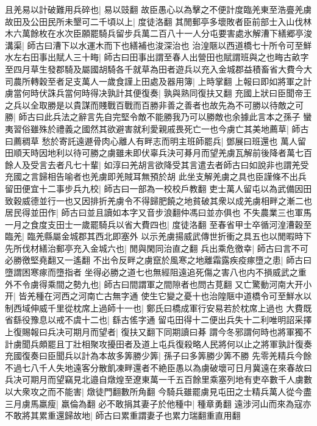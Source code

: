 且羌易以計破難用兵碎也|{
	易以豉翻}
故臣愚心以為擊之不便計度臨羌東至浩亹羌虜故田及公田民所未墾可二千頃以上|{
	度徒洛翻}
其閒郵亭多壞敗者臣前部士入山伐林木六萬餘枚在水次臣願罷騎兵留步兵萬二百八十一人分屯要害處氷解漕下繕郷亭浚溝渠|{
	師古曰漕下以水運木而下也繕補也浚深治也}
治湟陿以西道橋七十所令可至鮮水左右田事出賦人三十畮|{
	師古曰田事出謂至春人出營田也賦謂班與之也畮古畝字}
至四月草生發郡騎及屬國胡騎各千就草為田者遊兵以充入金城郡益積畜省大費今大司農所轉穀至者足支萬人一歲食謹上田處及器用簿|{
	上時掌翻}
上報曰即如將軍之計虜當何時伏誅兵當何時得决孰計其便復奏|{
	孰與熟同復扶又翻}
充國上狀曰臣聞帝王之兵以全取勝是以貴謀而賤戰百戰而百勝非善之善者也故先為不可勝以待敵之可勝|{
	師古曰此兵法之辭言先自完堅令敵不能勝我乃可以勝敵也余據此言本之孫子}
蠻夷習俗雖殊於禮義之國然其欲避害就利愛親戚畏死亡一也今虜亡其美地薦草|{
	師古曰薦稠草}
愁於寄託遠遯骨肉心離人有畔志而明主班師罷兵|{
	鄧展曰班還也}
萬人留田順天時因地利以待可勝之虜雖未即伏辜兵決可朞月而望羌虜瓦解前後降者萬七百餘人及受言去者凡七十輩|{
	如淳曰羌胡言欲降受其言遣去者師古曰如說非也謂羌受充國之言歸相告喻者也羌虜即羌賊耳無預於胡}
此坐支解羌虜之具也臣謹條不出兵留田便宜十二事步兵九校|{
	師古曰一部為一校校戶教翻}
吏士萬人留屯以為武備因田致穀威德並行一也又因排折羌虜令不得歸肥饒之地貧破其衆以成羌虜相畔之漸二也居民得並田作|{
	師古曰並且讀如本字又音步浪翻仲馮曰並亦俱也}
不失農業三也軍馬一月之食度支田士一歲罷騎兵以省大費四也|{
	度徒洛翻}
至春省甲士卒循河湟漕穀至臨羌|{
	臨羌縣屬金城郡其西北即塞外}
以示羌虜揚威武傳世折衝之具五也以閒暇時下先所伐材繕治郵亭充入金城六也|{
	閒與閑同治直之翻}
兵出乘危徼幸|{
	師古曰言不可必勝徼堅堯翻又一遙翻}
不出令反畔之虜竄於風寒之地離霜露疾疫瘃墮之患|{
	師古曰墮謂困寒瘃而墮指者}
坐得必勝之道七也無經阻遠追死傷之害八也内不損威武之重外不令虜得乘間之勢九也|{
	師古曰間謂軍之間隙者也問古莧翻}
又亡驚動河南大开小开|{
	皆羌種在河西之河南亡古無字通}
使生它變之憂十也治隍陿中道橋令可至鮮水以制西域伸威千里從枕席上過師十一也|{
	鄭氏曰橋成軍行安易若於枕席上過也}
大費既省繇役豫息以戒不虞十二也|{
	繇古傜字通}
留屯田得十二便出兵失十二利唯明詔采擇上復賜報曰兵决可期月而望者|{
	復扶又翻下同期讀曰朞}
謂今冬邪謂何時也將軍獨不計虜聞兵頗罷且丁壯相聚攻擾田者及道上屯兵復殺略人民將何以止之將軍孰計復奏充國復奏曰臣聞兵以計為本故多筭勝少筭|{
	孫子曰多筭勝少筭不勝}
先零羌精兵今餘不過七八千人失地遠客分散飢凍畔還者不絶臣愚以為虜破壞可日月冀遠在來春故曰兵决可期月而望竊見北邉自燉煌至遼東萬一千五百餘里乘塞列地有吏卒數千人虜數以大衆攻之而不能害|{
	燉徒門翻數所角翻}
今騎兵雖罷虜見屯田之士精兵萬人從今盡三月虜馬羸瘦|{
	羸倫為翻}
必不敢捐其妻子於他種中|{
	種章勇翻}
遠涉河山而來為寇亦不敢將其累重還歸故地|{
	師古曰累重謂妻子也累力瑞翻重直用翻}
